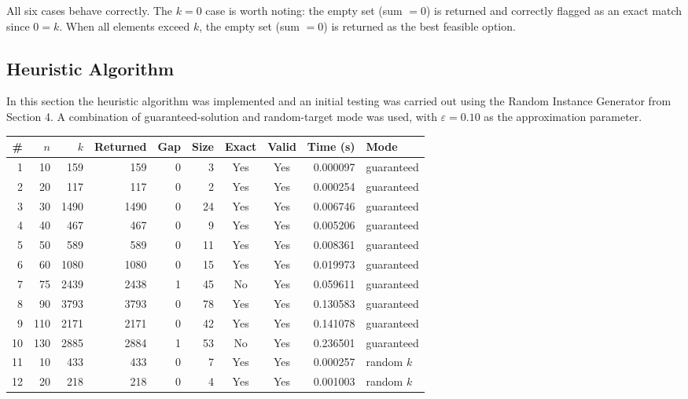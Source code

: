 \documentclass[12pt,a4paper]{article}
\theoremstyle{definition}
\begin{document}
All six cases behave correctly. The $k = 0$ case is worth noting: the empty
set (sum $= 0$) is returned and correctly flagged as an exact match since
$0 = k$. When all elements exceed $k$, the empty set (sum $= 0$) is returned
as the best feasible option.

\subsection{Heuristic Algorithm}


In this section the heuristic algorithm was implemented and an initial testing was carried out using the Random Instance Generator from Section 4. A combination of guaranteed-solution and random-target mode was used, with $\varepsilon = 0.10$ as the approximation parameter.

\begin{table}[H]
  \centering
  \scriptsize
  \renewcommand{\arraystretch}{1.2}
  \begin{tabular}{rrrrrrccrl}
    \toprule
    \# & \(n\) & \(k\) & Returned & Gap & Size & Exact & Valid & Time (s) & Mode \\
    \midrule
     1 &  10 &  159 &  159 &   0 &   3 & Yes & Yes & 0.000097 & guaranteed \\
     2 &  20 &  117 &  117 &   0 &   2 & Yes & Yes & 0.000254 & guaranteed \\
     3 &  30 & 1490 & 1490 &   0 &  24 & Yes & Yes & 0.006746 & guaranteed \\
     4 &  40 &  467 &  467 &   0 &   9 & Yes & Yes & 0.005206 & guaranteed \\
     5 &  50 &  589 &  589 &   0 &  11 & Yes & Yes & 0.008361 & guaranteed \\
     6 &  60 & 1080 & 1080 &   0 &  15 & Yes & Yes & 0.019973 & guaranteed \\
     7 &  75 & 2439 & 2438 &   1 &  45 & No & Yes & 0.059611 & guaranteed \\
     8 &  90 & 3793 & 3793 &   0 &  78 & Yes & Yes & 0.130583 & guaranteed \\
     9 & 110 & 2171 & 2171 &   0 &  42 & Yes & Yes & 0.141078 & guaranteed \\
    10 & 130 & 2885 & 2884 &   1 &  53 & No & Yes & 0.236501 & guaranteed \\
    \midrule
    11 &  10 &  433 &  433 &   0 &   7 & Yes & Yes & 0.000257 & random $k$ \\
    12 &  20 &  218 &  218 &   0 &   4 & Yes & Yes & 0.001003 & random $k$ \\

\end{tabular}
\end{table}
\end{document}
